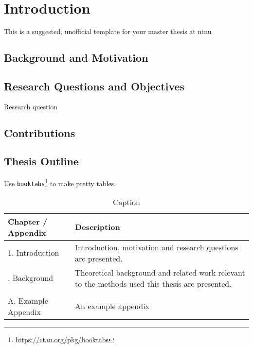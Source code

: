 \chapter{Introduction}
\label{ch:Introduction}

This is a suggested, unofficial template for your master thesis at \gls{ntnu}

\lipsum[1]

\section{Background and Motivation}

\lipsum[2-4]

\section{Research Questions and Objectives}
\lipsum[5]

\begin{description}[labelindent=0pt,style=multiline,leftmargin=0.6in]
    \item[RQ1:] Research question
\end{description}

\section{Contributions}
\lipsum[7]

\section{Thesis Outline}
Use \texttt{booktabs}\footnote{\url{https://ctan.org/pkg/booktabs}} to make pretty tables.

\begin{table}[ht]
    \centering
    \begin{tabular}{@{}lp{}@{}}
        \toprule
        Chapter / Appendix & Description \\
        \midrule
         1. Introduction & Introduction, motivation and research questions are presented.  \\ \addlinespace
         2. Background & Theoretical background and related work relevant to the methods used this thesis are presented. \\ \\ \addlinespace \addlinespace
         
         A. Example Appendix & An example appendix \\
         \bottomrule
         
    \end{tabular}
    \caption{Caption}
    \label{tab:intro_thesis_overview}
\end{table}

